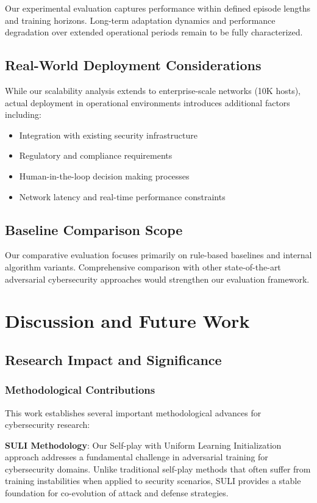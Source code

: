 \documentclass[11pt]{article}
\theoremstyle{definition}
\theoremstyle{plain}
\begin{document}
Our experimental evaluation captures performance within defined episode lengths and training horizons. Long-term adaptation dynamics and performance degradation over extended operational periods remain to be fully characterized.

\subsection{Real-World Deployment Considerations}

While our scalability analysis extends to enterprise-scale networks (10K hosts), actual deployment in operational environments introduces additional factors including:
\begin{itemize}
\item Integration with existing security infrastructure
\item Regulatory and compliance requirements
\item Human-in-the-loop decision making processes
\item Network latency and real-time performance constraints
\end{itemize}

\subsection{Baseline Comparison Scope}

Our comparative evaluation focuses primarily on rule-based baselines and internal algorithm variants. Comprehensive comparison with other state-of-the-art adversarial cybersecurity approaches would strengthen our evaluation framework.

\section{Discussion and Future Work}

\subsection{Research Impact and Significance}

\subsubsection{Methodological Contributions}
This work establishes several important methodological advances for cybersecurity research:

\textbf{SULI Methodology}: Our Self-play with Uniform Learning Initialization approach addresses a fundamental challenge in adversarial training for cybersecurity domains. Unlike traditional self-play methods that often suffer from training instabilities when applied to security scenarios, SULI provides a stable foundation for co-evolution of attack and defense strategies.
\end{document}
